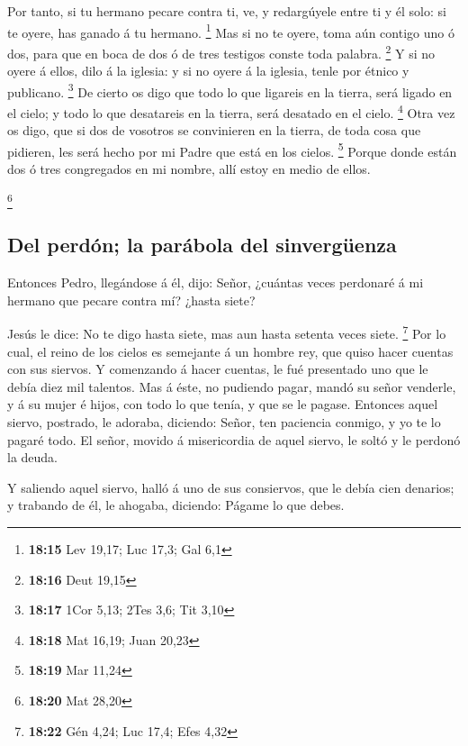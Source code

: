  Por tanto, si tu hermano pecare contra ti, ve, y
redargúyele entre ti y él solo: si te oyere, has ganado á tu hermano.
\footnote{\textbf{18:15} Lev 19,17; Luc 17,3; Gal 6,1} 
Mas si no te oyere, toma aún contigo uno ó dos, para que en boca de dos
ó de tres testigos conste toda palabra. \footnote{\textbf{18:16} Deut
  19,15}  Y si no oyere á ellos, dilo á la iglesia: y si
no oyere á la iglesia, tenle por étnico y publicano. \footnote{\textbf{18:17}
  1Cor 5,13; 2Tes 3,6; Tit 3,10}  De cierto os digo que
todo lo que ligareis en la tierra, será ligado en el cielo; y todo lo
que desatareis en la tierra, será desatado en el cielo. \footnote{\textbf{18:18}
  Mat 16,19; Juan 20,23}  Otra vez os digo, que si dos de
vosotros se convinieren en la tierra, de toda cosa que pidieren, les
será hecho por mi Padre que está en los cielos. \footnote{\textbf{18:19}
  Mar 11,24}  Porque donde están dos ó tres congregados
en mi nombre, allí estoy en medio de ellos.

\footnote{\textbf{18:20} Mat 28,20}

\hypertarget{del-perduxf3n-la-paruxe1bola-del-sinverguxfcenza}{%
\subsection{Del perdón; la parábola del
sinvergüenza}\label{del-perduxf3n-la-paruxe1bola-del-sinverguxfcenza}}

 Entonces Pedro, llegándose á él, dijo: Señor, ¿cuántas
veces perdonaré á mi hermano que pecare contra mí? ¿hasta siete?

 Jesús le dice: No te digo hasta siete, mas aun hasta
setenta veces siete. \footnote{\textbf{18:22} Gén 4,24; Luc 17,4; Efes
  4,32}  Por lo cual, el reino de los cielos es semejante
á un hombre rey, que quiso hacer cuentas con sus siervos.
 Y comenzando á hacer cuentas, le fué presentado uno que
le debía diez mil talentos.  Mas á éste, no pudiendo
pagar, mandó su señor venderle, y á su mujer é hijos, con todo lo que
tenía, y que se le pagase.  Entonces aquel siervo,
postrado, le adoraba, diciendo: Señor, ten paciencia conmigo, y yo te lo
pagaré todo.  El señor, movido á misericordia de aquel
siervo, le soltó y le perdonó la deuda.

 Y saliendo aquel siervo, halló á uno de sus consiervos,
que le debía cien denarios; y trabando de él, le ahogaba, diciendo:
Págame lo que debes.

